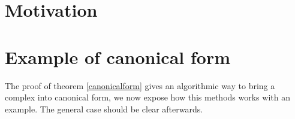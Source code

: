 \section{Motivation}






%
%
%
%
%
%
%
%


\section{Example of canonical form}

The proof of theorem \ref{canonicalform} gives an
algorithmic way to bring a complex into canonical form, 
we now expose how this methods works with an example. 
The general case should be clear afterwards.



